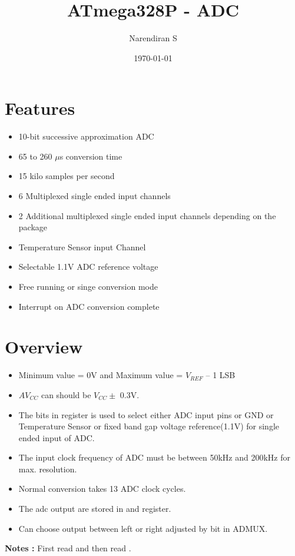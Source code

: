 \documentclass{article}
\title{ATmega328P - ADC}
\author{Narendiran S}
\date{\today}
\begin{document}
\maketitle

\section{Features}
\begin{itemize}
    \item 10-bit successive approximation ADC
    \item 65 to 260 $\mu$s conversion time
    \item 15 kilo samples per second
    \item 6 Multiplexed single ended input channels
    \item 2 Additional multiplexed single ended input channels depending on the package
    \item Temperature Sensor input Channel
    \item Selectable 1.1V ADC reference voltage
    \item Free running or singe conversion mode
    \item Interrupt on ADC conversion complete
\end{itemize}
\section{Overview}
\begin{itemize}
    \item Minimum value = 0V and Maximum value = $V_{REF}$ – 1 LSB
    \item $AV_{CC}$ can should be $V_{CC} \pm$ 0.3V.
    \item The  bits in  register is used to select either ADC input pins or GND or Temperature Sensor or fixed band gap voltage reference(1.1V) for single ended input of ADC.
    \item The input clock frequency of ADC must be between 50kHz and 200kHz for max. resolution.
    \item Normal conversion takes 13 ADC clock cycles.
    \item The adc output are stored in  and  register.
    \item Can choose output between left or right adjusted by  bit in ADMUX.
\end{itemize}

\textbf{Notes :} First read  and then read .
\end{document}
